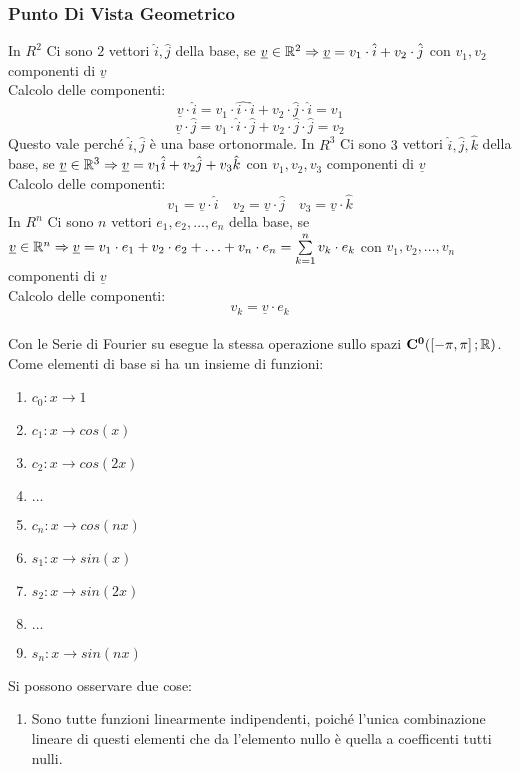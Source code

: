 \subsubsection{Punto Di Vista Geometrico}
In $R^2$ Ci sono $2$ vettori $\hat{i},\hat{j}$ della base, se $\underline{v}\in \mathbb{R}^2 \Rightarrow \underline{v}=v_1\cdot \hat{i}+v_2\cdot \hat{j}$ con $v_1,v_2$ componenti di $\underline{v}$\\
Calcolo delle componenti:\\
$$\underline{v}\cdot \hat{i} = v_1\cdot \hat{i\cdot }\hat{i}+v_2\cdot \hat{j}\cdot \hat{i}=v_1$$
$$\underline{v}\cdot \hat{j} = v_1\cdot \hat{i}\cdot \hat{j}+v_2\cdot \hat{j}\cdot \hat{j}=v_2$$
Questo vale perché $\hat{i},\hat{j}$ è una base ortonormale.
In $R^3$ Ci sono $3$ vettori $\hat{i},\hat{j},\hat{k}$ della base, se $\underline{v}\in \mathbb{R}^3 \Rightarrow \underline{v}=v_1\hat{i}+v_2\hat{j}+v_3\hat{k}$ con $v_1,v_2,v_3$ componenti di $\underline{v}$\\
Calcolo delle componenti:
$$ v_1=\underline{v}\cdot \hat{i}\quad v_2=\underline{v}\cdot \hat{j}\quad v_3=\underline{v}\cdot \hat{k}  $$
In $R^n$ Ci sono $n$ vettori $e_1,e_2,\ldots,e_n$ della base, se $\underline{v}\in \mathbb{R}^n \Rightarrow \underline{v}=v_1\cdot e_1+v_2\cdot e_2+\ldots+v_n\cdot e_n=\sum\limits_{k=1}^{n}v_k\cdot e_k$ con $v_1,v_2,\ldots,v_n$ componenti di $\underline{v}$\\
Calcolo delle componenti:
$$v_k=\underline{v}\cdot e_k$$
\\
Con le Serie di Fourier su esegue la stessa operazione sullo spazi $\mathbf{C^{0}}(\left[-\pi,\pi\right]; \mathbb{R})$. Come elementi di base si ha un insieme di funzioni:
\begin{enumerate}
	\item $c_0:x\to 1$
	\item $c_1:x\to cos(x)$
	\item $c_2:x\to cos(2x)$
	\item $\ldots$
	\item $c_n:x\to cos(nx)$
	\item $s_1:x\to sin(x)$
	\item $s_2:x\to sin(2x)$
	\item $\ldots$
	\item $s_n:x\to sin(nx)$
\end{enumerate}
Si possono osservare due cose:
\begin{enumerate}
	\item Sono tutte funzioni linearmente indipendenti, poiché l'unica combinazione lineare di questi elementi che da l'elemento nullo è quella a coefficenti tutti nulli.
\end{enumerate}
